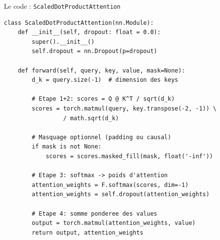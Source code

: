 \documentclass[aspectratio=169, 11pt]{beamer}
\begin{document}
\begin{frame}[fragile]{Le code : \texttt{ScaledDotProductAttention}}
\begin{lstlisting}[style=python, title={\texttt{src/transformers/attention.py} --- Lignes 56--97}]
class ScaledDotProductAttention(nn.Module):
    def __init__(self, dropout: float = 0.0):
        super().__init__()
        self.dropout = nn.Dropout(p=dropout)

    def forward(self, query, key, value, mask=None):
        d_k = query.size(-1)  # dimension des keys

        # Etape 1+2: scores = Q @ K^T / sqrt(d_k)
        scores = torch.matmul(query, key.transpose(-2, -1)) \
                 / math.sqrt(d_k)

        # Masquage optionnel (padding ou causal)
        if mask is not None:
            scores = scores.masked_fill(mask, float('-inf'))

        # Etape 3: softmax -> poids d'attention
        attention_weights = F.softmax(scores, dim=-1)
        attention_weights = self.dropout(attention_weights)

        # Etape 4: somme ponderee des values
        output = torch.matmul(attention_weights, value)
        return output, attention_weights
\end{lstlisting}
\end{frame}
\end{document}
